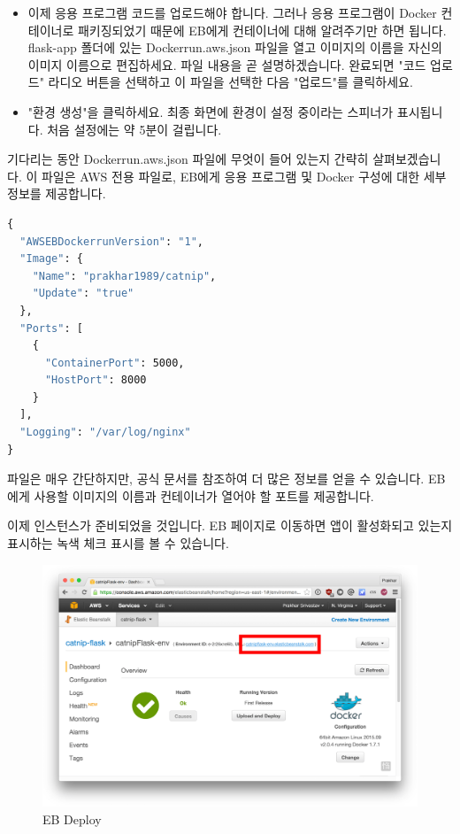 \begin{itemize}
    \item 이제 응용 프로그램 코드를 업로드해야 합니다. 그러나 응용 프로그램이 Docker 컨테이너로 패키징되었기 때문에 EB에게 컨테이너에 대해 알려주기만 하면 됩니다. flask-app 폴더에 있는 Dockerrun.aws.json 파일을 열고 이미지의 이름을 자신의 이미지 이름으로 편집하세요. 파일 내용을 곧 설명하겠습니다. 완료되면 "코드 업로드" 라디오 버튼을 선택하고 이 파일을 선택한 다음 "업로드"를 클릭하세요.
    \item "환경 생성"을 클릭하세요. 최종 화면에 환경이 설정 중이라는 스피너가 표시됩니다. 처음 설정에는 약 5분이 걸립니다.
\end{itemize}
기다리는 동안 Dockerrun.aws.json 파일에 무엇이 들어 있는지 간략히 살펴보겠습니다. 이 파일은 AWS 전용 파일로, EB에게 응용 프로그램 및 Docker 구성에 대한 세부 정보를 제공합니다.
\begin{lstlisting}[language=dockerfile]
{
  "AWSEBDockerrunVersion": "1",
  "Image": {
    "Name": "prakhar1989/catnip",
    "Update": "true"
  },
  "Ports": [
    {
      "ContainerPort": 5000,
      "HostPort": 8000
    }
  ],
  "Logging": "/var/log/nginx"
}
\end{lstlisting}

파일은 매우 간단하지만, 공식 문서를 참조하여 더 많은 정보를 얻을 수 있습니다. EB에게 사용할 이미지의 이름과 컨테이너가 열어야 할 포트를 제공합니다.

이제 인스턴스가 준비되었을 것입니다. EB 페이지로 이동하면 앱이 활성화되고 있는지 표시하는 녹색 체크 표시를 볼 수 있습니다.
\begin{figure}
\includegraphics[width=\textwidth]{images/eb-deploy.png}
\caption{EB Deploy}
\end{figure}



